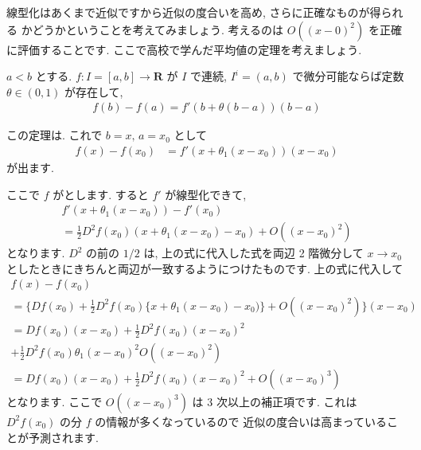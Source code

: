 \documentclass[openany, a4paper, oneside]{jsbook}
\begin{document}
線型化はあくまで近似ですから近似の度合いを高め, さらに正確なものが得られる
かどうかということを考えてみましょう.
考えるのは $O\left ( (x-0)^2 \right)$ を正確に評価することです.
ここで高校で学んだ平均値の定理を考えましょう.
\begin{thm}[平均値の定理]
 $a<b$ とする.  $f:I=[a,b]\to \bm{R}$ が
 $I$ で連続,  $I^i=(a,b)$ で微分可能ならば定数 $\theta \in (0,1)$ が存在して, \begin{align}
            f (b)-f (a)=f'\left ( b+\theta (b-a)\right) (b-a)
    \end{align}\end{thm}
この定理は.
これで $b=x,\, a=x_0$ として
    \begin{align}
        f (x)-f (x_0) &= f'(x + \theta _1 (x-x_0)) (x-x_0)
    \end{align}
が出ます.

ここで $f$ がとします. すると $f'$ が線型化できて,
\begin{gather}
 f'(x + \theta _1 (x-x_0)) - f'(x_0) \\
 =
 \frac{1}{2}D^2f (x_0) (x+ \theta _1 (x-x_0)-x_0)
  +O\left ( (x-x_0)^2 \right)
\end{gather}
となります.
$D^2$ の前の $1/2$ は, 上の式に代入した式を両辺 2 階微分して
$x \to x_0$ としたときにきちんと両辺が一致するようにつけたものです.
上の式に代入して
\begin{gather}
 f (x)-f (x_0) \\
 = \biggl \{ Df (x_0)
 +\frac{1}{2}D^2f (x_0)\{ x
 +\theta _1 (x-x_0)-x_0) \}
 +O\left ( (x-x_0)^2 \right) \biggr \}(x-x_0) \\
 = Df (x_0) (x-x_0)
 +\frac{1}{2}D^2f (x_0) (x-x_0)^2 \\
 +\frac{1}{2}
 D^2f (x_0)\theta _1 (x-x_0)^2O\left ( (x-x_0)^2 \right)     \\
 = Df (x_0) (x-x_0)
 +\frac{1}{2}D^2f (x_0) (x-x_0)^2
 +O\left ( (x-x_0)^3 \right)
\end{gather}
となります. ここで $O\left ( (x-x_0)^3 \right)$ は 3 次以上の補正項です.
これは $D^2f (x_0)$ の分 $f$ の情報が多くなっているので
近似の度合いは高まっていることが予測されます.
\end{document}

